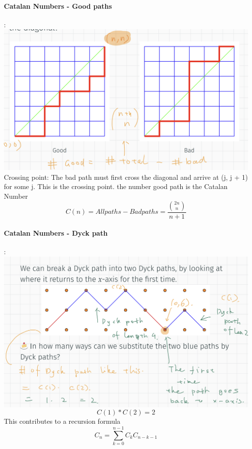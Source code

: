 \documentclass{article}
\begin{document}
\paragraph{Catalan Numbers - Good paths}:\newline
\includegraphics{0001}\newline
Crossing point:\newline
The bad path must first cross the diagonal and arrive at (j, j + 1)
for some j. This is the crossing point.\newline
the number good path is the Catalan Number
$$C(n)=Allpaths-Badpaths=\frac{\binom{2n}{n}}{n+1}$$
\paragraph{Catalan Numbers - Dyck path}:\newline
\includegraphics{0002}
$$C(1)*C(2)=2$$ This contributes to a recursion formula $$C_n=\sum_{k=0}^{n-1}C_kC_{n-k-1}$$
\end{document}
